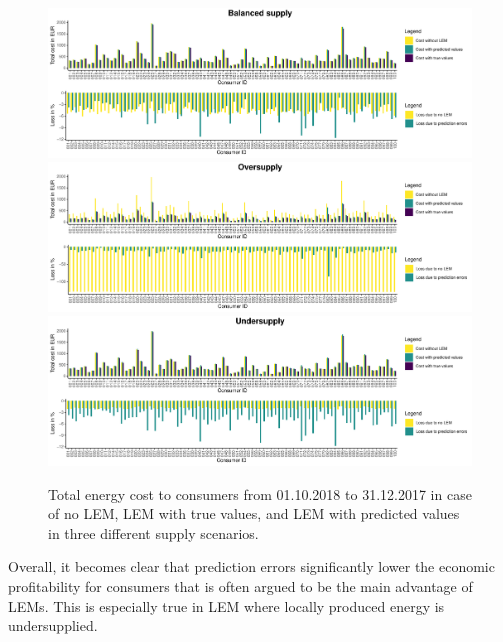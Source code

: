 \begin{figure}[htbp]
    \centering
    \includegraphics[width=\textwidth]{thesis/graphs/marketsimulation/totalenergycost.pdf}\\\vspace{.6cm}
    \includegraphics[width=\textwidth]{thesis/graphs/marketsimulation/totalenergycost_oversupply.pdf}\\\vspace{.6cm}
    \includegraphics[width=\textwidth]{thesis/graphs/marketsimulation/totalenergycost_undersupply.pdf}
    \caption[Total energy cost to consumers in different supply scenarios]{Total energy cost to consumers from 01.10.2018 to 31.12.2017 in case of no LEM, LEM with true values, and LEM with predicted values in three different supply scenarios. \quantnet\href{}{}}
    \label{Fig:total_energycost}
\end{figure}
%

Overall, it becomes clear that prediction errors significantly lower the economic profitability for consumers that is often argued to be the main advantage of LEMs. This is especially true in LEM where locally produced energy is undersupplied.




